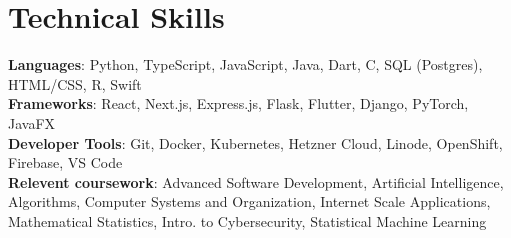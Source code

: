 \documentclass[letterpaper,11pt]{article}
\begin{document}
\section{Technical Skills}
 \begin{itemize}[leftmargin=0.15in, label={}]
    \small{\item{
     \textbf{Languages}{: Python, TypeScript, JavaScript, Java, Dart, C, SQL (Postgres), HTML/CSS, R, Swift} \\
     \textbf{Frameworks}{: React, Next.js, Express.js, Flask, Flutter, Django, PyTorch, JavaFX} \\
     \textbf{Developer Tools}{: Git, Docker, Kubernetes, Hetzner Cloud, Linode, OpenShift, Firebase, VS Code} \\
     \textbf{Relevent coursework}{: Advanced Software Development, Artificial Intelligence, Algorithms, Computer Systems and Organization, Internet Scale Applications, Mathematical Statistics, Intro. to Cybersecurity, Statistical Machine Learning}
    }}
 \end{itemize}


\end{document}
